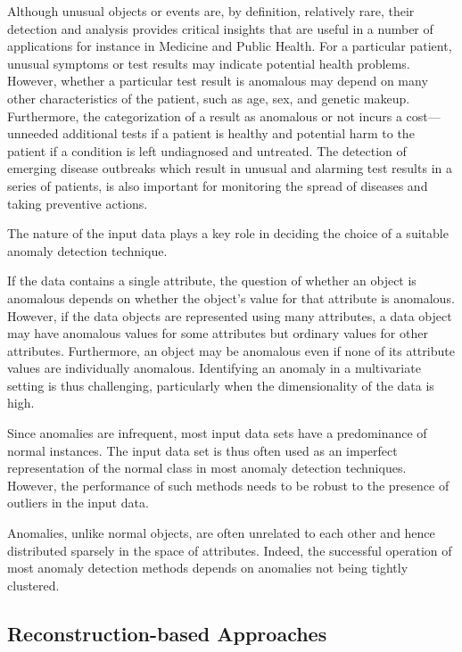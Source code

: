 Although unusual objects or events are, by deﬁnition, relatively rare, their detection and analysis provides critical insights that are useful in a number of
applications for instance in Medicine and Public Health. For a particular patient, unusual symptoms or test results may indicate potential health problems. However, whether a particular test result is anomalous may depend on many other characteristics of the patient, such as age, sex, and genetic makeup. Furthermore, the categorization of a result as anomalous or not incurs a cost—unneeded additional tests if a patient is healthy and potential harm to the patient if a condition is left undiagnosed and untreated. The detection of emerging disease outbreaks which result in unusual and alarming test results in a series of patients, is also important for monitoring the spread of diseases and taking preventive actions.

The nature of the input data plays a key role in deciding the choice of a suitable anomaly detection technique.

If the data contains a single attribute, the question of whether an object is anomalous depends on whether the object’s value for that attribute is anomalous. However, if the data objects are represented using many attributes, a data object may have anomalous values for some attributes but ordinary values for other attributes. Furthermore, an object may be anomalous even if none of its attribute values are individually anomalous. Identifying an anomaly in a multivariate
setting is thus challenging, particularly when the dimensionality of the data is high.

Since anomalies are infrequent, most input data sets have a predominance of normal instances. The input data set is thus often used as an imperfect representation of the normal class in most anomaly detection techniques. However, the performance of such methods needs to be robust to the presence of outliers in the input data.

Anomalies, unlike normal objects, are often unrelated to each other and hence distributed sparsely in the space of attributes. Indeed, the successful operation of most anomaly detection methods depends on anomalies not being tightly clustered.

\subsection*{Reconstruction-based Approaches}\label{Reconstruction-based Approaches}

